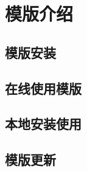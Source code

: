 
\chapter{模版介绍}
    \lipsum[1]

\section{模版安装}
    \lipsum[1]

\section{在线使用模版}
    \lipsum[1]

\section{本地安装使用}
    \lipsum[1]\cite{adve1996shared}

\section{模版更新}
    \lipsum[1]



